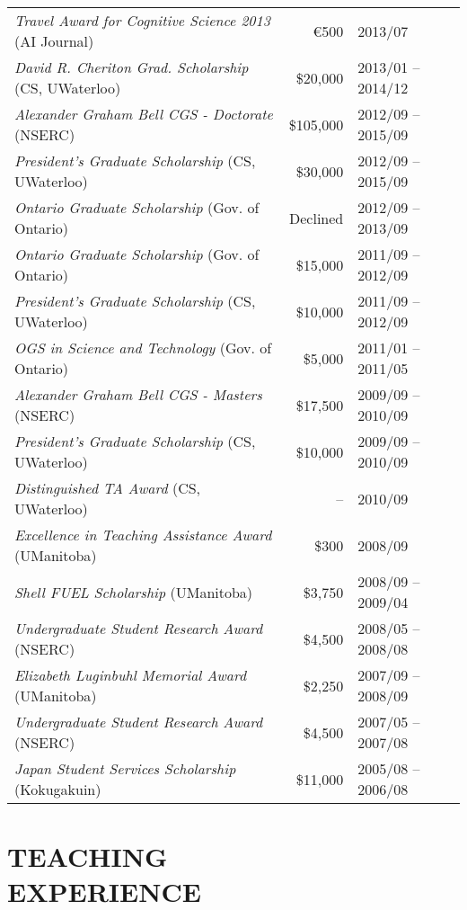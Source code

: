 \documentclass[line,margin]{res}
\begin{document}
\begin{resume}
\begin{tabular}{lrl}
{\sl Travel Award for Cognitive Science 2013} (AI Journal) &
\euro{}500 & 2013/07 \\
{\sl David R. Cheriton Grad. Scholarship} (CS, UWaterloo) &
\$20,000 & 2013/01 -- 2014/12 \\
{\sl Alexander Graham Bell CGS - Doctorate} (NSERC) &
\$105,000 & 2012/09 -- 2015/09 \\
{\sl President's Graduate Scholarship} (CS, UWaterloo) &
\$30,000 & 2012/09 -- 2015/09 \\
{\sl Ontario Graduate Scholarship} (Gov. of Ontario) &
Declined & 2012/09 -- 2013/09 \\
{\sl Ontario Graduate Scholarship} (Gov. of Ontario) &
\$15,000 & 2011/09 -- 2012/09 \\
{\sl President's Graduate Scholarship} (CS, UWaterloo) &
\$10,000 & 2011/09 -- 2012/09 \\
{\sl OGS in Science and Technology} (Gov. of Ontario) &
\$5,000 & 2011/01 -- 2011/05 \\
{\sl Alexander Graham Bell CGS - Masters} (NSERC) &
\$17,500 & 2009/09 -- 2010/09 \\
{\sl President's Graduate Scholarship} (CS, UWaterloo) &
\$10,000 & 2009/09 -- 2010/09 \\
{\sl Distinguished TA Award} (CS, UWaterloo) &
-- & 2010/09 \\
{\sl Excellence in Teaching Assistance Award} (UManitoba) &
\$300 & 2008/09 \\
{\sl Shell FUEL Scholarship} (UManitoba) &
\$3,750 & 2008/09 -- 2009/04 \\
{\sl Undergraduate Student Research Award} (NSERC) &
\$4,500 & 2008/05 -- 2008/08 \\
{\sl Elizabeth Luginbuhl Memorial Award} (UManitoba) &
\$2,250 & 2007/09 -- 2008/09 \\
{\sl Undergraduate Student Research Award} (NSERC) &
\$4,500 & 2007/05 -- 2007/08 \\
{\sl Japan Student Services Scholarship} (Kokugakuin) &
\$11,000 & 2005/08 -- 2006/08
\end{tabular}

\section{TEACHING \\EXPERIENCE}


\end{resume}
\end{document}
